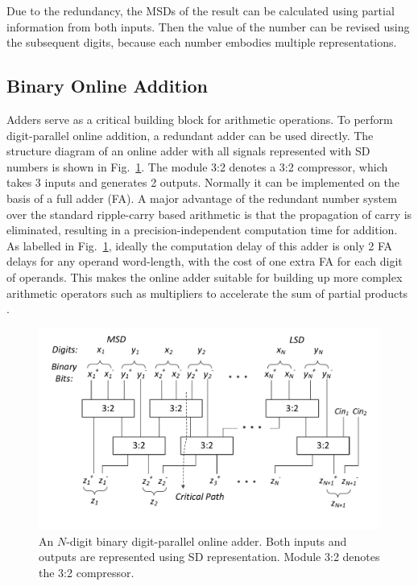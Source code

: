 \documentclass[conference]{IEEEtran}
\begin{document}
Due to the redundancy, the MSDs of the result can be calculated using partial information from both inputs. Then the value of the number can be revised using the subsequent digits, because each number embodies multiple representations.

\subsection{Binary Online Addition}
Adders serve as a critical building block for arithmetic operations. To perform digit-parallel online addition, a redundant adder can be used directly. The structure diagram of an online adder with all signals represented with SD numbers is shown in Fig.~\ref{Fig:Radix2SD_adder}. The module 3:2 denotes a 3:2 compressor, which takes 3 inputs and generates 2 outputs. Normally it can be implemented on the basis of a full adder (FA). A major advantage of the redundant number system over the standard ripple-carry based arithmetic is that the propagation of carry is eliminated, resulting in a precision-independent computation time for addition. As labelled in Fig.~\ref{Fig:Radix2SD_adder}, ideally the computation delay of this adder is only 2 FA delays for any operand word-length, with the cost of one extra FA for each digit of operands. This makes the online adder suitable for building up more complex arithmetic operators such as multipliers to accelerate the sum of partial products \cite{RedundantMult_1987}.

\begin{figure}[htbp]
	\centering
	\includegraphics[width=.5\textwidth]{./Figures/SDAdder2.pdf}
    \vspace{-6ex}
	\caption{An $N$-digit binary digit-parallel online adder. Both inputs and outputs are represented using SD representation. Module 3:2 denotes the 3:2 compressor.}
	\label{Fig:Radix2SD_adder}
\end{figure}

\end{document}
